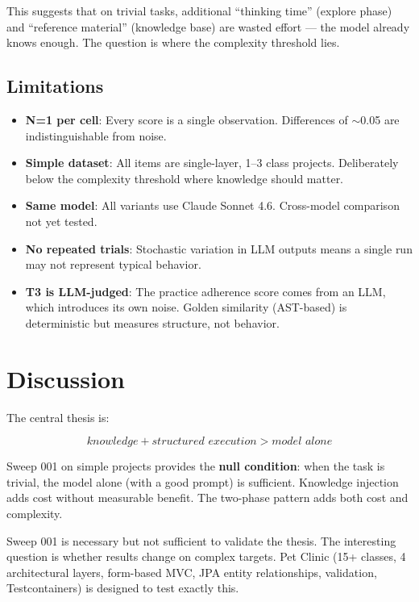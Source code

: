 \documentclass[11pt,a4paper]{article}
\begin{document}
This suggests that on trivial tasks, additional ``thinking time'' (explore phase)
and ``reference material'' (knowledge base) are wasted effort --- the model already
knows enough. The question is where the complexity threshold lies.

\subsection{Limitations}

\begin{itemize}
  \item \textbf{N=1 per cell}: Every score is a single observation. Differences of $\sim$0.05 are indistinguishable from noise.
  \item \textbf{Simple dataset}: All items are single-layer, 1--3 class projects. Deliberately below the complexity threshold where knowledge should matter.
  \item \textbf{Same model}: All variants use Claude Sonnet 4.6. Cross-model comparison not yet tested.
  \item \textbf{No repeated trials}: Stochastic variation in LLM outputs means a single run may not represent typical behavior.
  \item \textbf{T3 is LLM-judged}: The practice adherence score comes from an LLM, which introduces its own noise. Golden similarity (AST-based) is deterministic but measures structure, not behavior.
\end{itemize}

\section{Discussion}

The central thesis is:

\[
\textit{knowledge} + \textit{structured execution} > \textit{model alone}
\]

Sweep 001 on simple projects provides the \textbf{null condition}: when the task
is trivial, the model alone (with a good prompt) is sufficient. Knowledge injection
adds cost without measurable benefit. The two-phase pattern adds both cost and
complexity.

Sweep 001 is necessary but not sufficient to validate the thesis. The interesting
question is whether results change on complex targets. Pet Clinic (15+ classes,
4 architectural layers, form-based MVC, JPA entity relationships, validation,
Testcontainers) is designed to test exactly this.
\end{document}
